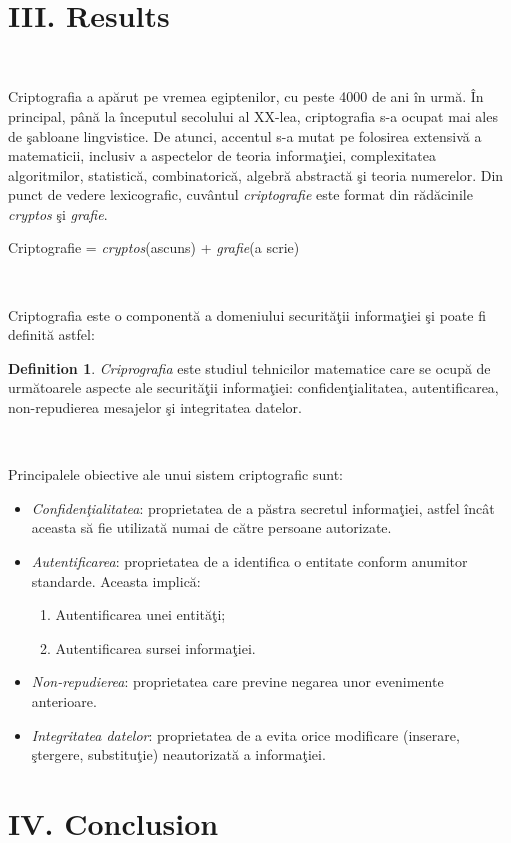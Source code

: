 \documentclass[11pt, a4papper]{report}
\theoremstyle{plain}
\theoremstyle{definition}
\newtheorem{definition}{Definition}
\theoremstyle{definition}
\theoremstyle{proposition}
\begin{document}
\

\newpage

\chapter*{III. Results}

\

Criptografia a apărut pe vremea egiptenilor, cu peste 4000 de ani în urmă. În principal, până la începutul secolului al XX-lea, criptografia s-a ocupat mai ales de şabloane lingvistice. De atunci, accentul s-a mutat pe folosirea extensivă a matematicii, inclusiv a aspectelor de teoria informaţiei, complexitatea algoritmilor, statistică, combinatorică, algebră abstractă şi teoria numerelor. Din punct de vedere lexicografic, cuvântul \textit{criptografie} este format din rădăcinile \textit{cryptos} şi \textit{grafie}.

\begin{center}
Criptografie = \textit{cryptos}(ascuns) + \textit{grafie}(a scrie)
\end{center}
\

Criptografia este o componentă a domeniului securităţii informaţiei şi poate fi definită astfel:

\begin{definition} \textit{Criprografia} este studiul tehnicilor matematice care se ocupă de următoarele aspecte ale securităţii informaţiei: confidenţialitatea, autentificarea, non-repudierea mesajelor şi integritatea datelor.
\end{definition}
\

Principalele obiective ale unui sistem criptografic sunt:
\begin{itemize}
	\item \textit{Confidenţialitatea}: proprietatea de a păstra secretul informaţiei, astfel încât aceasta să fie utilizată numai de către persoane autorizate.
	\item \textit{Autentificarea}: proprietatea de a identifica o entitate conform anumitor standarde. Aceasta implică:		
	\begin{enumerate}
		\item Autentificarea unei entităţi;
		\item Autentificarea sursei informaţiei.
	\end{enumerate}
	\item \textit{Non-repudierea}: proprietatea care previne negarea unor evenimente anterioare.
	\item \textit{Integritatea datelor}: proprietatea de a evita orice modificare (inserare, ştergere, substituţie) neautorizată a informaţiei.
\
\end{itemize}


\newpage

\chapter*{IV. Conclusion}

\nocite{*}



\end{document}
